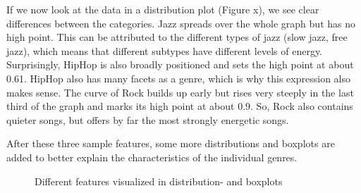 If we now look at the data in a distribution plot (Figure x),
we see clear differences between the categories.
Jazz spreads over the whole graph but has no high point.
This can be attributed to the different types of jazz (slow jazz, free jazz),
which means that different subtypes have different levels of energy.
Surprisingly, HipHop is also broadly positioned and sets the high point at about 0.61.
HipHop also has many facets as a genre, which is why this expression also makes sense.
The curve of Rock builds up early but rises very steeply in the last third of the graph and marks
its high point at about 0.9. So, Rock also contains quieter songs,
but offers by far the most strongly energetic songs.

After these three sample features, some more distributions and boxplots are added to better
explain the characteristics of the individual genres.

\begin{figure}[H]
    \centering
    \qquad
    \qquad
    \qquad
    \qquad
    \caption{Different features visualized in distribution- and boxplots}%
    \label{fig:du_ds_bp_comparison}%
\end{figure}